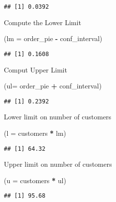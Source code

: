 \documentclass[]{article}
\newenvironment{Shaded}{\begin{snugshade}}{\end{snugshade}}
\newcommand{\DataTypeTok}[1]{\textcolor[rgb]{0.13,0.29,0.53}{#1}}
\newcommand{\NormalTok}[1]{#1}
\newcommand{\OperatorTok}[1]{\textcolor[rgb]{0.81,0.36,0.00}{\textbf{#1}}}
\newcommand{\StringTok}[1]{\textcolor[rgb]{0.31,0.60,0.02}{#1}}
\begin{document}
\begin{verbatim}
## [1] 0.0392
\end{verbatim}

Compute the Lower Limit

\begin{Shaded}
\begin{Highlighting}[]
\NormalTok{(}\DataTypeTok{lm =}\NormalTok{ order_pie }\OperatorTok{-}\StringTok{ }\NormalTok{conf_interval)}
\end{Highlighting}
\end{Shaded}

\begin{verbatim}
## [1] 0.1608
\end{verbatim}

Comput Upper Limit

\begin{Shaded}
\begin{Highlighting}[]
\NormalTok{(}\DataTypeTok{ul=}\NormalTok{ order_pie }\OperatorTok{+}\StringTok{ }\NormalTok{conf_interval)}
\end{Highlighting}
\end{Shaded}

\begin{verbatim}
## [1] 0.2392
\end{verbatim}

Lower limit on number of customers

\begin{Shaded}
\begin{Highlighting}[]
\NormalTok{(}\DataTypeTok{l =}\NormalTok{ customers }\OperatorTok{*}\StringTok{ }\NormalTok{lm)}
\end{Highlighting}
\end{Shaded}

\begin{verbatim}
## [1] 64.32
\end{verbatim}

Upper limit on number of customers

\begin{Shaded}
\begin{Highlighting}[]
\NormalTok{(}\DataTypeTok{u =}\NormalTok{ customers }\OperatorTok{*}\StringTok{ }\NormalTok{ul)}
\end{Highlighting}
\end{Shaded}

\begin{verbatim}
## [1] 95.68
\end{verbatim}
\end{document}
